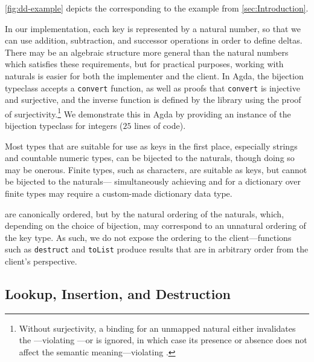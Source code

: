 \autoref{fig:dd-example} depicts the \dd{} corresponding to the example from \autoref{sec:Introduction}.


In our implementation, each key is represented by a natural number, so that we can use addition, subtraction, and successor operations in order to define deltas.
%
There may be an algebraic structure more general than the natural numbers which satisfies these requirements, but for practical purposes, working with naturals
%
is easier for both the implementer and the client. In Agda, the bijection typeclass accepts a \texttt{convert} function, as well as proofs that \texttt{convert}
%
is injective and surjective, and the inverse function is defined by the library using the proof of surjectivity.\footnote{\hspace{0.01in}%
%
Without surjectivity, a binding for an unmapped natural either invalidates the \dd---violating \Total---or is ignored, in which case its presence or absence does not affect the semantic meaning---violating \Extensional.
%
}
%
We demonstrate this in Agda by
%
providing an instance of the bijection typeclass for integers ($25$ lines of code).

Most types that are suitable for use as keys in the first place, especially strings and countable numeric types, can be bijected to the naturals,
%
though doing so may be onerous. Finite types, such as characters, are suitable as keys, but cannot be bijected to the naturals---%
%
simultaneously achieving \Total{} and \Extensional{} for a dictionary over finite types may require a custom-made dictionary data type.

\Ddls{} are canonically ordered, but by the natural ordering of the naturals, which, depending on the choice of bijection, may correspond to an unnatural
%
ordering of the key type. As such, we do not expose the ordering to the client---functions such as \texttt{destruct} and \texttt{toList} produce results
%
that are in arbitrary order from the client's perspective.


\subsection{Lookup, Insertion, and Destruction}
\label{sec:DD:basics}

